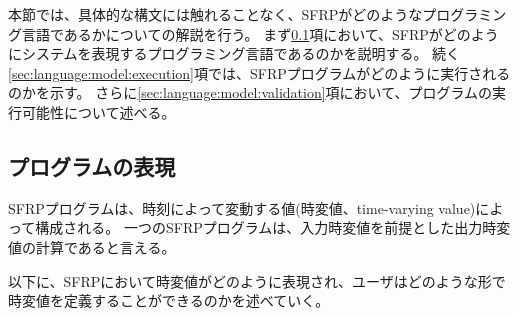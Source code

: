 本節では、具体的な構文には触れることなく、SFRPがどのようなプログラミング言語であるかについての解説を行う。
まず\ref{sec:language:model:program}項において、SFRPがどのようにシステムを表現するプログラミング言語であるのかを説明する。
続く\ref{sec:language:model:execution}項では、SFRPプログラムがどのように実行されるのかを示す。
さらに\ref{sec:language:model:validation}項において、プログラムの実行可能性について述べる。

\subsection{プログラムの表現}\label{sec:language:model:program}
SFRPプログラムは、時刻によって変動する値(時変値、time-varying value)によって構成される。
一つのSFRPプログラムは、入力時変値を前提とした出力時変値の計算であると言える。

以下に、SFRPにおいて時変値がどのように表現され、ユーザはどのような形で時変値を定義することができるのかを述べていく。


